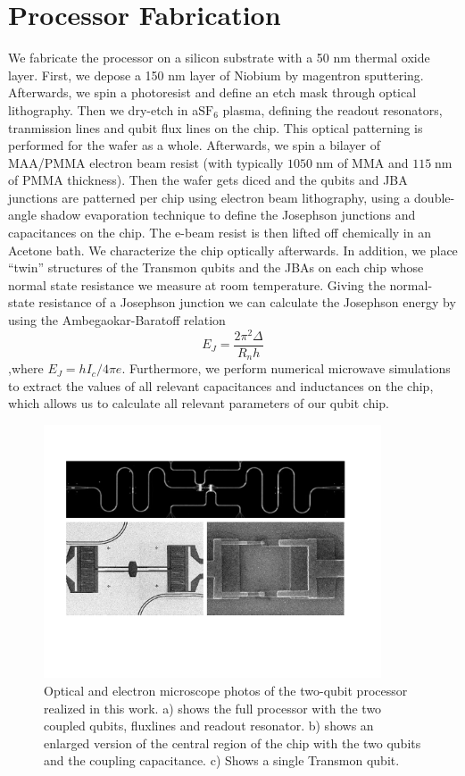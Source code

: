 \section{Processor Fabrication}

We fabricate the processor on a silicon substrate with a 50 nm thermal oxide layer. First, we depose a 150 nm layer of Niobium by magentron sputtering. Afterwards, we spin a photoresist and define an etch mask through optical lithography. Then we dry-etch in a$\mathrm{SF}_6$ plasma, defining the readout resonators, tranmission lines and qubit flux lines on the chip. This optical patterning is performed for the wafer as a whole. Afterwards, we spin a bilayer of MAA/PMMA electron beam resist (with typically $1050\;\mathrm{nm}$ of MMA and $115\;\mathrm{nm}$ of PMMA thickness). Then the wafer gets diced and the qubits and JBA junctions are patterned per chip using electron beam lithography, using a double-angle shadow evaporation technique to define the Josephson junctions and capacitances on the chip. The e-beam resist is then lifted off chemically in an Acetone bath. We characterize the chip optically afterwards. In addition, we place ``twin'' structures of the Transmon qubits and the JBAs on each chip whose normal state resistance we measure at room temperature. Giving the normal-state resistance of a Josephson junction we can calculate the Josephson energy by using the Ambegaokar-Baratoff relation
%
\begin{equation}
E_J = \frac{2\pi^2 \Delta}{R_n h}
\end{equation}
%
,where $E_J = h I_c / 4\pi e$. Furthermore, we perform numerical microwave simulations to extract the values of all relevant capacitances and inductances on the chip, which allows us to calculate all relevant parameters of our qubit chip.

\begin{figure}
	\includegraphics[width=10cm]{"./material/figures/2-qubit-processor/processor photos"}
	\caption{Optical and electron microscope photos of the two-qubit processor realized in this work. a) shows the full processor with the two coupled qubits, fluxlines and readout resonator. b) shows an enlarged version of the central region of the chip with the two qubits and the coupling capacitance. c) Shows a single Transmon qubit.}
	\label{fig:setup_wiring}
\end{figure}

